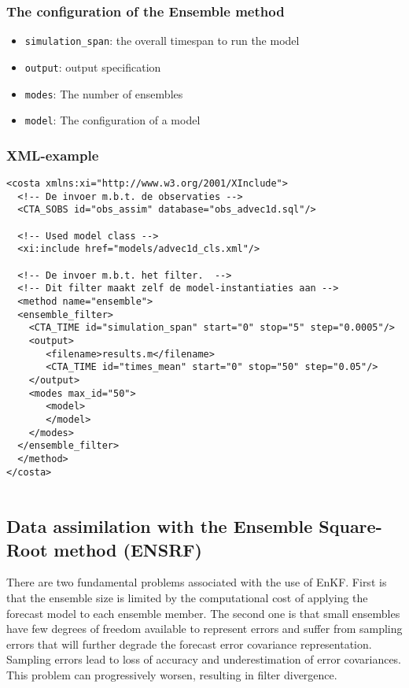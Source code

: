 \documentclass[a4paper,12pt]{article}
\begin{document}

\subsubsection{The configuration of the Ensemble method}
\begin{itemize}
\item {\tt simulation\_span}: the overall timespan to run the model
\item {\tt output}: output specification
\item {\tt modes}: The number of ensembles
\item {\tt model}: The configuration of a model
\end{itemize}

\subsubsection{XML-example}
\begin{verbatim}
<costa xmlns:xi="http://www.w3.org/2001/XInclude">
  <!-- De invoer m.b.t. de observaties -->
  <CTA_SOBS id="obs_assim" database="obs_advec1d.sql"/>

  <!-- Used model class -->
  <xi:include href="models/advec1d_cls.xml"/>

  <!-- De invoer m.b.t. het filter.  -->
  <!-- Dit filter maakt zelf de model-instantiaties aan -->
  <method name="ensemble"> 
  <ensemble_filter>
    <CTA_TIME id="simulation_span" start="0" stop="5" step="0.0005"/>
    <output>
       <filename>results.m</filename>
       <CTA_TIME id="times_mean" start="0" stop="50" step="0.05"/>
    </output>
    <modes max_id="50">
       <model>
       </model>
    </modes>
  </ensemble_filter>
  </method> 
</costa>


\end{verbatim}


\subsection{Data assimilation  with the Ensemble Square-Root method (ENSRF)}

       There are two fundamental problems associated with the use of EnKF.
       First is that the ensemble size is limited by the computational cost of
       applying the forecast model to each ensemble member. The second one is
       that small ensembles have few degrees of freedom available to represent
       errors and suffer from sampling errors that will further degrade
       the forecast error covariance representation. Sampling errors lead to loss
       of accuracy and underestimation of error covariances. This problem can
       progressively worsen, resulting in filter divergence.
\end{document}
